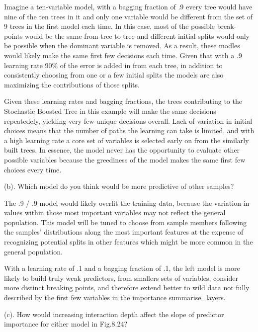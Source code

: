 \documentclass[]{report}
\begin{document}
Imagine a ten-variable model, with a bagging fraction of .9 every tree
would have nine of the ten trees in it and only one variable would be
different from the set of 9 trees in the first model each time. In this
case, most of the possible break-points would be the same from tree to
tree and different initial splits would only be possible when the
dominant variable is removed. As a result, these modles would likely
make the same first few decisions each time. Given that with a .9
learning rate 90\% of the error is added in from each tree, in addition
to consistently choosing from one or a few initial splits the models are
also maximizing the contributions of those splits.

Given these learning rates and bagging fractions, the trees contributing
to the Stochastic Boosted Tree in this example will make the same
decisions repeatedely, yielding very few unique decisions overall. Lack
of variation in initial choices means that the number of paths the
learning can take is limited, and with a high learning rate a core set
of variables is selected early on from the similarly built trees. In
essence, the model never has the opportunity to evaluate other possible
variables because the greediness of the model makes the same first few
choices every time.

\begin{subquestion}{(b).} Which model do you think would be more predictive of other samples?\end{subquestion}

The .9 / .9 model would likely overfit the training data, because the
variation in values within those most important variables may not
reflect the general population. This model will be tuned to choose from
sample members following the samples' distributions along the most
important features at the expense of recognizing potential splits in
other features which might be more common in the general population.

With a learning rate of .1 and a bagging fraction of .1, the left model
is more likely to build truly weak predictors, from smallers sets of
variables, consider more distinct breaking points, and therefore extend
better to wild data not fully described by the first few variables in
the importance summarise\_layers.

\begin{subquestion}{(c).} How would increasing interaction depth affect the slope of predictor importance for either model in Fig.8.24?\end{subquestion}
\end{document}
